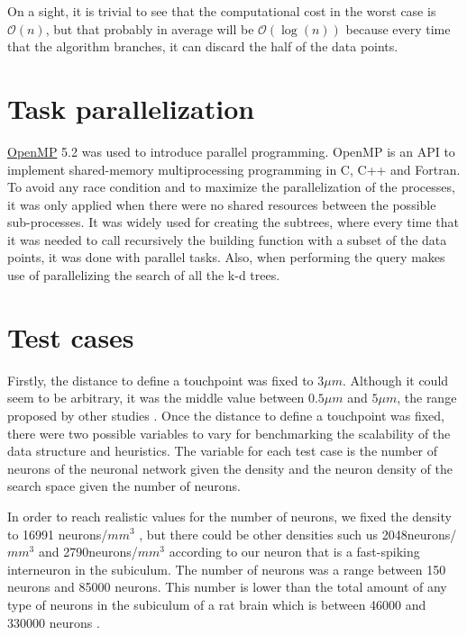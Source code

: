 On a sight, it is trivial to see that the computational cost in the worst case is $\mathcal{O}(n)$, but that probably in average will be $\mathcal{O}(\log{}(n))$ because every time that the algorithm branches, it can discard the half of the data points.
\pagebreak

\section{Task parallelization}
\href{https://www.openmp.org/}{OpenMP} 5.2 was used to introduce parallel programming. OpenMP is an API to implement shared-memory multiprocessing programming in C, C++ and Fortran. To avoid any race condition and to maximize the parallelization of the processes, it was only applied when there were no shared resources between the possible sub-processes. It was widely used for creating the subtrees, where every time that it was needed to call recursively the building function with a subset of the data points, it was done with parallel tasks. Also, when performing the query makes use of parallelizing the search of all the k-d trees.

\section{Test cases}
Firstly, the distance to define a touchpoint was fixed to $3 \mu m$. Although it could seem to be arbitrary, it was the middle value between $0.5 \mu m$ and $5 \mu m$, the range proposed by other studies \cite{10.3389/fncom.2015.00120, doi:10.1073/pnas.1202128109}. Once the distance to define a touchpoint was fixed, there were two possible variables to vary for benchmarking the scalability of the data structure and heuristics. The variable for each test case is the number of neurons of the neuronal network given the density and the neuron density of the search space given the number of neurons.

In order to reach realistic values for the number of neurons, we fixed the density to 16991 neurons/$mm^3$ \cite{Trujillo-Estrada2014-uv}, but there could be other densities such us 2048neurons/$mm^3$ and 2790neurons/$mm^3$ \cite{Keller2018-dm} according to our neuron that is a fast-spiking interneuron in the subiculum. The number of neurons was a range between 150 neurons and 85000 neurons. This number is lower than the total amount of any type of neurons in the subiculum of a rat brain which is between 46000 and 330000 neurons \cite{Mulders1997-bh}.

